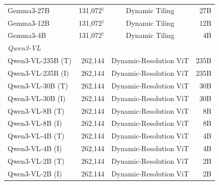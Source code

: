 \documentclass{article}
\begin{document}
\begin{table}[h]
\begin{tabular}{lrcr}
\midrule
Gemma3-27B & 131,072$^\dagger$ & Dynamic Tiling & 27B \\
Gemma3-12B & 131,072$^\dagger$ & Dynamic Tiling & 12B \\
Gemma3-4B & 131,072$^\dagger$ & Dynamic Tiling & 4B \\
\midrule
\multicolumn{4}{l}{\textit{Qwen3-VL}} \\
\midrule
Qwen3-VL-235B (T) & 262,144 & Dynamic-Resolution ViT & 235B \\
Qwen3-VL-235B (I) & 262,144 & Dynamic-Resolution ViT & 235B \\
Qwen3-VL-30B (T) & 262,144 & Dynamic-Resolution ViT & 30B \\
Qwen3-VL-30B (I) & 262,144 & Dynamic-Resolution ViT & 30B \\
Qwen3-VL-8B (T) & 262,144 & Dynamic-Resolution ViT & 8B \\
Qwen3-VL-8B (I) & 262,144 & Dynamic-Resolution ViT & 8B \\
Qwen3-VL-4B (T) & 262,144 & Dynamic-Resolution ViT & 4B \\
Qwen3-VL-4B (I) & 262,144 & Dynamic-Resolution ViT & 4B \\
Qwen3-VL-2B (T) & 262,144 & Dynamic-Resolution ViT & 2B \\
Qwen3-VL-2B (I) & 262,144 & Dynamic-Resolution ViT & 2B \\
\bottomrule
\end{tabular}
\end{table}
\end{document}
